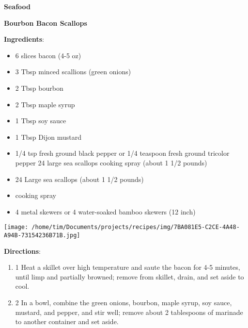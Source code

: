 \documentclass[11pt, twoside, openany]{book}
\begin{document}
{\newpage \LARGE \textbf{Seafood}} \label{seafood}\vspace{4mm}\\
\noindent\begin{minipage}[t]{\linewidth}%
{\Large\textbf{Bourbon Bacon Scallops}} \label{bourbon-bacon-scallops}\hfill\textit{}\\
\noindent\begin{minipage}[t]{0.78\linewidth}%
\textbf{Ingredients}:\vspace{-3mm}
\begin{multicols}{2}
\begin{itemize}\setlength\itemsep{-1mm}
\item 6 slices bacon (4-5 oz)
\item 3 Tbsp minced scallions (green onions)
\item 2 Tbsp bourbon
\item 2 Tbsp maple syrup
\item 1 Tbsp soy sauce
\item 1 Tbsp Dijon mustard
\item 1/4 tsp fresh ground black pepper or 1/4 teaspoon fresh ground tricolor pepper 24 large sea scallops cooking spray (about 1 1/2 pounds)
\item 24 Large sea scallops (about 1 1/2 pounds)
\item cooking spray
\item 4 metal skewers or 4 water-soaked bamboo skewers (12 inch)
\end{itemize}
\end{multicols}
\end{minipage}
\noindent\begin{minipage}[t]{0.18\linewidth}
\centering \strut\vspace*{-\baselineskip}\newline
\texttt{[image: /home/tim/Documents/projects/recipes/img/7BA081E5-C2CE-4A48-A94B-73154236B71B.jpg]}\\
\end{minipage}\vspace{3mm}
\textbf{Directions}:
\vspace{-3mm}\begin{enumerate}\setlength\itemsep{-1mm}
\item 1 Heat a skillet over high temperature and saute the bacon for 4-5 minutes, until limp and partially browned; remove from skillet, drain, and set aside to cool. 
\item 2 In a bowl, combine the green onions, bourbon, maple syrup, soy sauce, mustard, and pepper, and stir well; remove about 2 tablespoons of marinade to another container and set aside. 

\end{enumerate}
\end{minipage}
\end{document}
